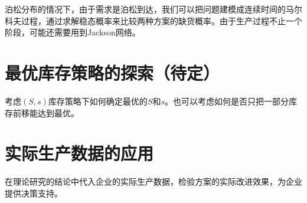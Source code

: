 泊松分布的情况下，由于需求是泊松到达，我们可以把问题建模成连续时间的马尔科夫过程，通过求解稳态概率来比较两种方案的缺货概率。由于生产过程不止一个阶段，可能还需要用到Jackson网络。






\section{最优库存策略的探索（待定）}

考虑$(S,s)$库存策略下如何确定最优的$S$和$s$。也可以考虑如何是否只把一部分库存前移能达到最优。






\section{实际生产数据的应用}

在理论研究的结论中代入企业的实际生产数据，检验方案的实际改进效果，为企业提供决策支持。